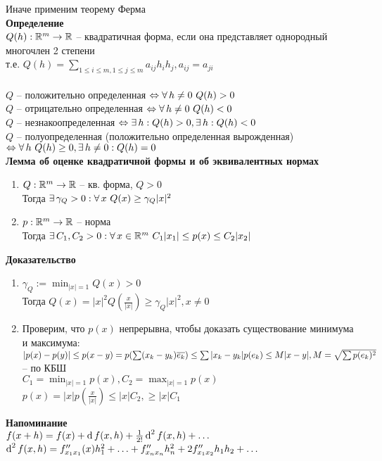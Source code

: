 \documentclass[12pt]{article}
\begin{document}
Иначе применим теорему Ферма\\
\textbf{Определение}\\
$Q(h): \mathbb{R}^m \rightarrow \mathbb{R}$ -- квадратичная форма, если она представляет однородный многочлен 2 степени\\
т.е. $Q(h) = \sum_{1 \leq i \leq m, 1 \leq j \leq m} a_{ij}h_i h_j, a_{ij} = a_{ji}$\\\\
$Q$ -- положительно определенная $\Leftrightarrow \forall\, h \neq 0\ Q(h) > 0$\\
$Q$ -- отрицательно определенная $\Leftrightarrow \forall\, h \neq 0\ Q(h) < 0$\\
$Q$ -- незнакоопределенная $\Leftrightarrow \exists\, h: Q(h) > 0, \exists\, h: Q(h) < 0$\\
$Q$ -- полуопределенная (положительно определенная вырожденная) $\Leftrightarrow \forall\, h\ Q(h) \geq 0, \exists\, h \neq 0: Q(h) = 0$\\
\textbf{Лемма об оценке квадратичной формы и об эквивалентных нормах}
\begin{enumerate}
    \item $Q: \mathbb{R}^m \rightarrow \mathbb{R}$ -- кв. форма, $Q > 0$\\
    Тогда $\exists\, \gamma_Q > 0: \forall\, x\ Q(x) \geq \gamma_Q|x|^2$
    \item $p: \mathbb{R}^m \rightarrow \mathbb{R}$ -- норма\\
    Тогда $\exists\, C_1, C_2 > 0: \forall\, x \in \mathbb{R}^m\ C_1|x_1| \leq p(x) \leq C_2|x_2|$
\end{enumerate}
\textbf{Доказательство}
\begin{enumerate}
    \item $\gamma_Q:= \min_{|x|=1} Q(x) > 0$\\
    Тогда $Q(x) = |x|^2Q(\frac x{|x|}) \geq \gamma_Q |x|^2, x \neq 0$
    \item Проверим, что $p(x)$ непрерывна, чтобы доказать существование минимума и максимума:\\
    $|p(x) - p(y)| \leq p(x-y) = p(\sum (x_k-y_k) \overline{e_k}) \leq \sum |x_k - y_k| p(e_k) \leq M|x-y|, M = \sqrt{\sum p(e_k)^2}$ -- по КБШ\\
    $C_1 = \min_{|x|=1}p(x), C_2 = \max_{|x|=1}p(x)$\\
    $p(x) = |x|p(\frac x{|x|}) \leq |x|C_2, \geq |x|C_1$
\end{enumerate}
\textbf{Напоминание}\\
$f(x+h) = f(x) + \operatorname{d} f(x, h) + \frac1{2!}\operatorname{d}^2 f(x,h) + \ldots$\\
$\operatorname{d}^2 f(x,h) = f''_{x_1x_1}(x) h_1^2 + \ldots + f''_{x_nx_n}h_n^2 + 2f''_{x_1x_2}h_1h_2 + \ldots$\\
\end{document}
